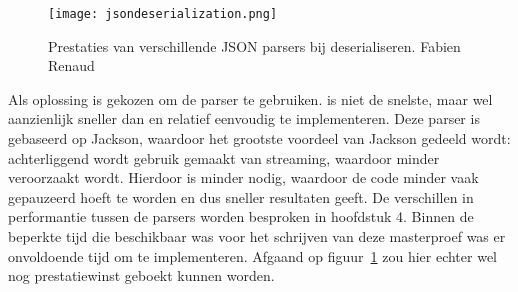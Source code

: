 \begin{figure}[h]
	\centering
	\texttt{[image: jsondeserialization.png]}
	\caption[Prestaties van JSON parsers]{Prestaties van verschillende JSON parsers bij deserialiseren.  Fabien Renaud}
	\label{fig:jsonparsersdeserialize}
\end{figure}

Als oplossing is gekozen om de  parser te gebruiken.  is niet de snelste, maar wel aanzienlijk sneller dan  en relatief eenvoudig te implementeren. Deze parser is gebaseerd op Jackson, waardoor het grootste voordeel van Jackson gedeeld wordt: achterliggend wordt gebruik gemaakt van streaming, waardoor minder  veroorzaakt wordt. Hierdoor is minder  nodig, waardoor de code minder vaak gepauzeerd hoeft te worden en dus sneller resultaten geeft. De verschillen in performantie tussen de parsers worden besproken in hoofdstuk 4. Binnen de beperkte tijd die beschikbaar was voor het schrijven van deze masterproef was er onvoldoende tijd om  te implementeren. Afgaand op figuur~\ref{fig:jsonparsersdeserialize} zou hier echter wel nog prestatiewinst geboekt kunnen worden.